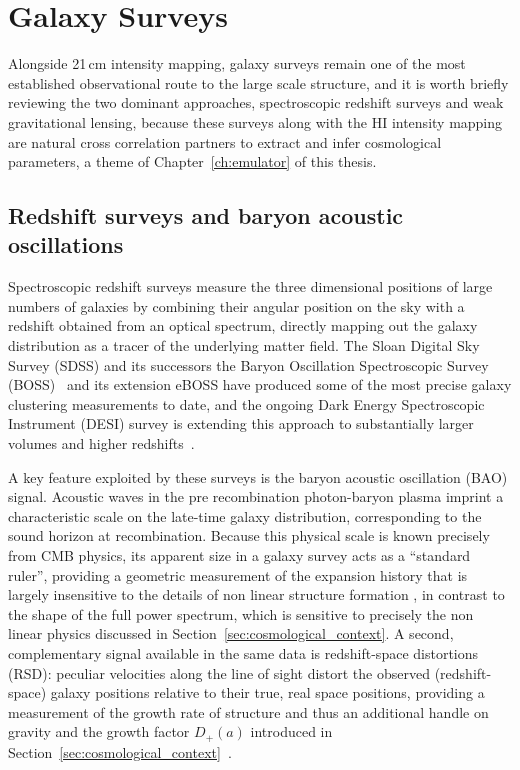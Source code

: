 \section{Galaxy Surveys}
\label{sec:galaxy_surveys}


Alongside 21\,cm intensity mapping, galaxy surveys remain one of the most established observational route to the large scale structure, and it is worth briefly reviewing the two dominant approaches, spectroscopic redshift surveys and weak gravitational lensing, because these surveys along with the HI intensity mapping are natural cross correlation partners to extract and infer cosmological parameters, a theme of Chapter~\ref{ch:emulator} of this thesis.

\subsection{Redshift surveys and baryon acoustic oscillations}

Spectroscopic redshift surveys measure the three dimensional positions of large numbers of galaxies by combining their angular position on the sky with a redshift obtained from an optical spectrum, directly mapping out the galaxy distribution as a tracer of the underlying matter field. The Sloan Digital Sky Survey (SDSS) and its successors the Baryon Oscillation Spectroscopic Survey (BOSS)~\citep{dawson_baryon_2013,BOSS:2016} and its extension eBOSS have produced some of the most precise galaxy clustering measurements to date, and the ongoing Dark Energy Spectroscopic Instrument (DESI) survey is extending this approach to substantially larger volumes and higher redshifts~\citep{DESIde}.

A key feature exploited by these surveys is the baryon acoustic oscillation (BAO) signal. Acoustic waves in the pre recombination photon-baryon plasma imprint a characteristic scale on the late-time galaxy distribution, corresponding to the sound horizon at recombination. Because this physical scale is known precisely from CMB physics, its apparent size in a galaxy survey acts as a ``standard ruler'', providing a geometric measurement of the expansion history that is largely insensitive to the details of non linear structure formation , in contrast to the shape of the full power spectrum, which is sensitive to precisely the non linear physics discussed in Section~\ref{sec:cosmological_context}. A second, complementary signal available in the same data is redshift-space distortions (RSD): peculiar velocities along the line of sight distort the observed (redshift-space) galaxy positions relative to their true, real space positions, providing a measurement of the growth rate of structure and thus an additional handle on gravity and the growth factor $D_+(a)$ introduced in Section~\ref{sec:cosmological_context}~\citep[e.g.][]{Ross:2014}.

